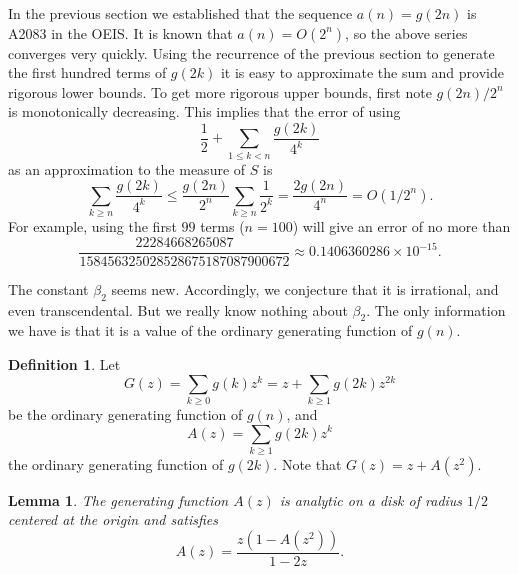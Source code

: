 \documentclass[12pt]{amsart}
\newtheorem{lemma}{Lemma}
\theoremstyle{definition}
\newtheorem{definition}{Definition}
\begin{document}
In the previous section we established that the sequence $a(n) = g(2n)$ is
A2083 in the OEIS. It is known that $a(n) = O(2^n)$, so the above series
converges very quickly. Using the recurrence of the previous section to
generate the first hundred terms of $g(2k)$ it is easy to approximate the sum
and provide rigorous lower bounds. To get more rigorous upper bounds, first
note $g(2n) / 2^n$ is monotonically decreasing. This implies that the error of
using
\begin{equation*}
    \frac{1}{2} + \sum_{1 \leq k < n} \frac{g(2k)}{4^k}
\end{equation*}
as an approximation to the measure of $S$ is
\begin{equation*}
    \sum_{k \geq n} \frac{g(2k)}{4^k}
        \leq \frac{g(2n)}{2^n} \sum_{k \geq n} \frac{1}{2^k}
        = \frac{2g(2n)}{4^n}
        = O(1/2^n).
\end{equation*}
For example, using the first $99$ terms ($n = 100$) will give an error of no
more than
\begin{equation*}
    \frac{22284668265087}{158456325028528675187087900672}
    \approx 0.1406360286 \times 10^{-15}.
\end{equation*}

The constant $\beta_2$ seems new. Accordingly, we conjecture that it is
irrational, and even transcendental. But we really know nothing about
$\beta_2$. The only information we have is that it is a value of the ordinary
generating function of $g(n)$.

\begin{definition}
    Let
    \begin{equation*}
        G(z) = \sum_{k \geq 0} g(k) z^k = z + \sum_{k \geq 1} g(2k) z^{2k}
    \end{equation*}
    be the ordinary generating function of $g(n)$, and
    \begin{equation*}
        A(z) = \sum_{k \geq 1} g(2k) z^k
    \end{equation*}
    the ordinary generating function of $g(2k)$. Note that $G(z) = z + A(z^2)$.
\end{definition}

\begin{lemma}
    The generating function $A(z)$ is analytic on a disk of radius $1 / 2$
    centered at the origin and satisfies
    \begin{equation*}
        A(z) = \frac{z(1 - A(z^2))}{1 - 2z}.
    \end{equation*}
\end{lemma}
\end{document}

